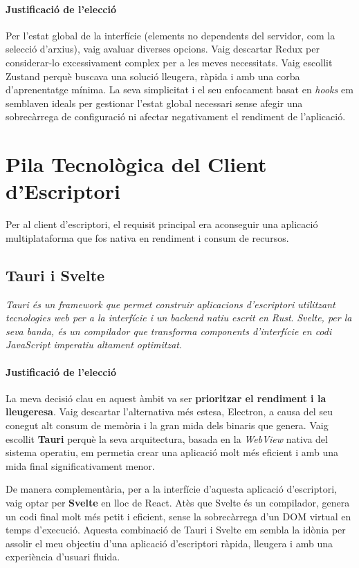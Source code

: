 \paragraph{Justificació de l'elecció}
Per l'estat global de la interfície (elements no dependents del servidor, com la selecció d'arxius), vaig avaluar diverses opcions. Vaig descartar Redux per considerar-lo excessivament complex per a les meves necessitats. Vaig escollit Zustand perquè buscava una solució lleugera, ràpida i amb una corba d'aprenentatge mínima. La seva simplicitat i el seu enfocament basat en \textit{hooks} em semblaven ideals per gestionar l'estat global necessari sense afegir una sobrecàrrega de configuració ni afectar negativament el rendiment de l'aplicació.

\section{Pila Tecnològica del Client d'Escriptori}
Per al client d'escriptori, el requisit principal era aconseguir una aplicació multiplataforma que fos nativa en rendiment i consum de recursos.

\subsection{Tauri i Svelte}
\textit{Tauri és un framework que permet construir aplicacions d'escriptori utilitzant tecnologies web per a la interfície i un backend natiu escrit en Rust}. \textit{Svelte, per la seva banda, és un compilador que transforma components d'interfície en codi JavaScript imperatiu altament optimitzat}.

\paragraph{Justificació de l'elecció}
La meva decisió clau en aquest àmbit va ser \textbf{prioritzar el rendiment i la lleugeresa}. Vaig descartar l'alternativa més estesa, Electron, a causa del seu conegut alt consum de memòria i la gran mida dels binaris que genera. Vaig escollit \textbf{Tauri} perquè la seva arquitectura, basada en la \textit{WebView} nativa del sistema operatiu, em permetia crear una aplicació molt més eficient i amb una mida final significativament menor.

De manera complementària, per a la interfície d'aquesta aplicació d'escriptori, vaig optar per \textbf{Svelte} en lloc de React. Atès que Svelte és un compilador, genera un codi final molt més petit i eficient, sense la sobrecàrrega d'un DOM virtual en temps d'execució. Aquesta combinació de Tauri i Svelte em sembla la idònia per assolir el meu objectiu d'una aplicació d'escriptori ràpida, lleugera i amb una experiència d'usuari fluida.

